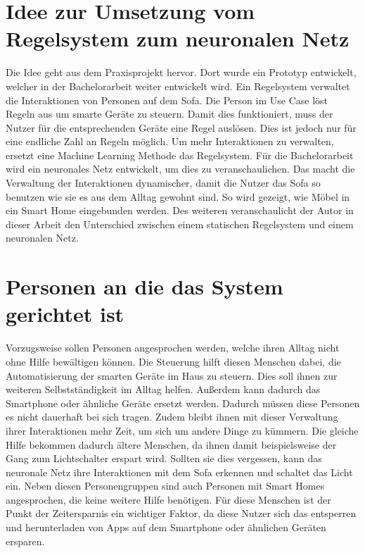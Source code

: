 \section{Idee zur Umsetzung vom Regelsystem zum neuronalen Netz}
Die Idee geht aus dem Praxisprojekt hervor. \citep{Schroeder2019} Dort wurde ein Prototyp entwickelt, welcher in der Bachelorarbeit weiter entwickelt wird. Ein Regelsystem verwaltet die Interaktionen von Personen auf dem Sofa. Die Person im Use Case löst Regeln aus um smarte Geräte zu steuern. Damit dies funktioniert, muss der Nutzer für die entsprechenden Geräte eine Regel auslösen. Dies ist jedoch nur für eine endliche Zahl an Regeln möglich. Um mehr Interaktionen zu verwalten, ersetzt eine Machine Learning Methode das Regelsystem. Für die Bachelorarbeit wird ein neuronales Netz entwickelt, um dies zu veranschaulichen. 
\newline
Das macht die Verwaltung der Interaktionen dynamischer, damit die Nutzer das Sofa so benutzen wie sie es aus dem Alltag gewohnt sind. So wird gezeigt, wie Möbel in ein Smart Home eingebunden werden. Des weiteren veranschaulicht der Autor in dieser Arbeit den Unterschied zwischen einem statischen Regelsystem und einem neuronalen Netz.

\section{Personen an die das System gerichtet ist}
\label{sec:persons}
Vorzugsweise sollen Personen angesprochen werden, welche ihren Alltag nicht ohne Hilfe bewältigen können. Die Steuerung hilft diesen Menschen dabei, die Automatisierung der smarten Geräte im Haus zu steuern. Dies soll ihnen zur weiteren Selbstständigkeit im Alltag helfen. Außerdem kann dadurch das Smartphone oder ähnliche Geräte ersetzt werden. Dadurch müssen diese Personen es nicht dauerhaft bei sich tragen. Zudem bleibt ihnen mit dieser Verwaltung ihrer Interaktionen mehr Zeit, um sich um andere Dinge zu kümmern. Die gleiche Hilfe bekommen dadurch ältere Menschen, da ihnen damit beispielsweise der Gang zum Lichtschalter erspart wird. Sollten sie dies vergessen, kann das neuronale Netz ihre Interaktionen mit dem Sofa erkennen und schaltet das Licht ein.
\newline
Neben diesen Personengruppen sind auch Personen mit Smart Homes angesprochen, die keine weitere Hilfe benötigen. Für diese Menschen ist der Punkt der Zeitersparnis ein wichtiger Faktor, da diese Nutzer sich das entsperren und herunterladen von Apps auf dem Smartphone oder ähnlichen Geräten ersparen.

